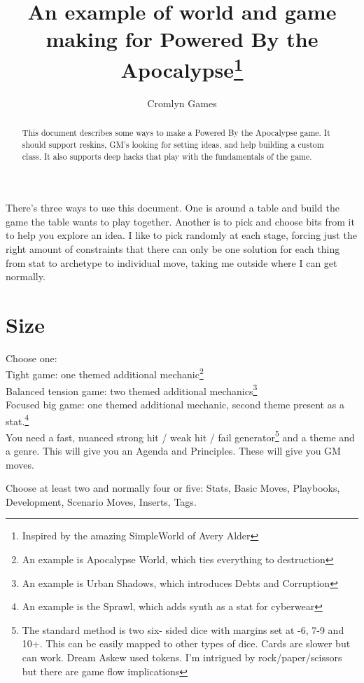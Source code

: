 \documentclass{tufte-handout}
\title{An example of world and game making for Powered By the Apocalypse\thanks{Inspired by the amazing SimpleWorld of Avery Alder}}
\author[Cromlyn Games]{Cromlyn Games}
\begin{document}
\maketitle%

\begin{abstract}
\noindent
This document describes some ways to make  a Powered By the Apocalypse game.
It should support reskins, GM's looking for setting ideas, and help building a custom class.
It also supports deep hacks that play with the fundamentals of the game.
\end{abstract}

There's three ways to use this document. One is around a table and build the game the table wants to play together. Another is to pick and choose bits from it to help you explore an idea. I like to pick randomly at each stage, forcing just the right amount of constraints that there can only be one solution for each thing from stat to archetype to individual move, taking me outside where I can get normally.

\section{Size}
Choose one:\\
Tight game: one themed additional mechanic\footnote{An example is Apocalypse World, which ties everything to destruction} \\
Balanced tension game: two themed additional mechanics\footnote{An example is Urban Shadows, which introduces Debts and Corruption}\\
Focused big game: one themed additional mechanic, second theme present as a stat.\footnote{An example is the Sprawl, which adds synth as a stat for cyberwear}\\


You need a fast, nuanced strong hit / weak hit / fail generator\footnote{The standard method is two six- sided dice with margins set at -6, 7-9 and 10+. This can be easily mapped to other types of dice. Cards are slower but can work. Dream Askew used tokens. I'm intrigued by rock/paper/scissors but there are game flow implications}
 and a theme and a genre. This will give you an Agenda and Principles. These will give you GM moves. 

Choose at least two and normally four or five:
Stats, Basic Moves, Playbooks, Development, Scenario Moves, Inserts, Tags.
\end{document}
